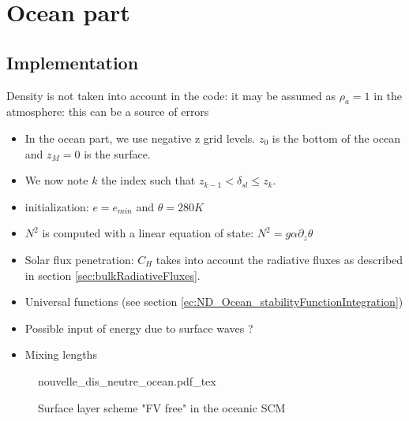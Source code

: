 \section{Ocean part}
\subsection{Implementation}
{\color{red} Density is not taken into account in the code:
it may be assumed as $\rho_a=1$ in the atmosphere: this can be
a source of errors}
\begin{itemize}
\item
In the ocean part, we use negative z grid levels.
$z_0$ is the bottom of the ocean and $z_{M}=0$ is the surface.
\item
We now note $k$ the index such that $z_{k-1} < \delta_{sl} \leq z_k$.
\item initialization: $e=e_{min}$ and $\theta = 280K$
\item $N^2$ is computed with a linear equation of state:
	$N^2 = g \alpha \partial_z \theta$
\item Solar flux penetration: $C_H$ takes into account the radiative
	fluxes as described in section \ref{sec:bulkRadiativeFluxes}.
\item Universal functions (see section
	\ref{ec:ND_Ocean_stabilityFunctionIntegration})
\item Possible input of energy due to surface waves ?
\item Mixing lengths

\end{itemize}
\begin{figure}
	{nouvelle_dis_neutre_ocean.pdf_tex}
	\caption{Surface layer scheme "FV free" in the oceanic SCM}
	\label{fig:ND_Ocean_nouvelle_dis_neutre}
\end{figure}

